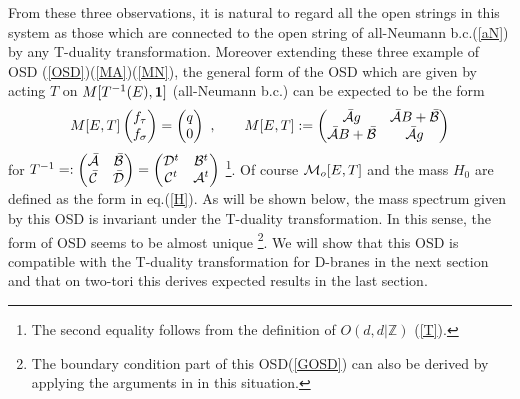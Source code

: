 \documentclass[a4paper,12pt]{article}
\newcommand{\Z}{{\mathbb{Z}}}
\newcommand{\bp}{\begin{pmatrix}}
\newcommand{\ep}{\end{pmatrix}}
\def \cA{{\cal A}}
\def \cB{{\cal B}}
\def \cC{{\cal C}}
\def \cD{{\cal D}}
\def \cAb{{\bar {\cal A}}}
\def \cBb{{\bar {\cal B}}}
\def \cCb{{\bar {\cal C}}}
\def \cDb{{\bar {\cal D}}}
\def \cA{{\cal A}}
\def \cM{{\cal M}}
\def \1{{\bf 1}}
\begin{document}
From these three observations, it is natural to regard  
all the open strings in this system as those which are connected to 
the open string of all-Neumann 
b.c.(\ref{aN}) by any T-duality transformation.
Moreover extending these three example of OSD
(\ref{OSD})(\ref{MA})(\ref{MN}), 
the general form of the OSD which are given by acting $T$ on 
$M[T^{-1}(E),\1]$ (all-Neumann b.c.) can be expected to be the form 
\begin{equation}
  M[E,T]\bp f_\tau\\ f_\sigma \ep =\bp q \\ 0\ep\ ,\qquad 
  M[E,T]:=\bp \cAb g& \cAb B + \cBb\\ \cAb B + \cBb&\cAb g \ep
 \label{GOSD}
\end{equation}
for \begin{math}T^{-1}=: \bp \cAb&\cBb\\ \cCb&\cDb\ep
=\bp \cD^t&\cB^t\\ \cC^t&\cA^t\ep \end{math}
\footnote{The second equality follows from the definition of $O(d,d |\Z)$ 
(\ref{T}). }. 
Of course $\cM_o[E,T]$ and the mass $H_0$ are defined as the form in 
eq.(\ref{H}). 
As will be shown below, 
the mass spectrum given by this OSD is invariant under 
the T-duality transformation. In this sense, the form of OSD seems to be 
almost unique
\footnote{The boundary condition part of this OSD(\ref{GOSD}) can also 
be derived by applying the arguments in \cite{Kam} in this situation. }. 
We will show that this OSD is compatible with 
the T-duality transformation for D-branes in the next section 
and that on two-tori this derives expected results in the last section. 
\end{document}
